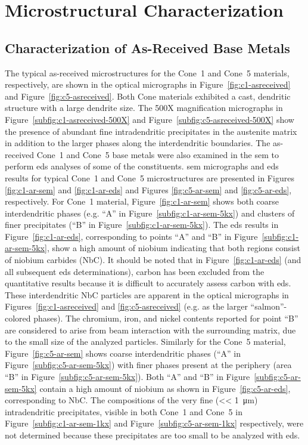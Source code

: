 {\section{Microstructural Characterization}
\subsection{Characterization of As-Received Base Metals}
The typical as-received microstructures for the Cone~1 and Cone~5 materials, respectively, are shown in the optical micrographs in Figure~\ref{fig:c1-asreceived} and Figure~\ref{fig:c5-asreceived}.  Both Cone materials exhibited a cast, dendritic structure with a large dendrite size.  The 500X magnification micrographs in Figure~\ref{subfig:c1-asreceived-500X} and Figure~\ref{subfig:c5-asreceived-500X} show the presence of abundant fine intradendritic precipitates in the austenite matrix in addition to the larger phases along the interdendritic boundaries. The as-received Cone~1 and Cone~5 base metals were also examined in the \gls{sem} to perform \gls{eds} analyses of some of the constituents. \Gls{sem} micrographs and \gls{eds} results for typical Cone~1 and Cone~5 microstructures are presented in Figures \ref{fig:c1-ar-sem} and \ref{fig:c1-ar-eds} and Figures \ref{fig:c5-ar-sem} and \ref{fig:c5-ar-eds}, respectively. For Cone~1 material, Figure~\ref{fig:c1-ar-sem} shows both coarse interdendritic phases (e.g. ``A'' in Figure~\ref{subfig:c1-ar-sem-5kx}) and clusters of finer precipitates (``B'' in Figure~\ref{subfig:c1-ar-sem-5kx}). The \gls{eds} results in Figure~\ref{fig:c1-ar-eds}, corresponding to points ``A'' and ``B'' in Figure~\ref{subfig:c1-ar-sem-5kx}, show a high amount of niobium indicating that both regions consist of niobium carbides (NbC). It should be noted that in Figure~\ref{fig:c1-ar-eds} (and all subsequent \gls{eds} determinations), carbon has been excluded from the quantitative results because it is difficult to accurately assess carbon with \gls{eds}. These interdendritic NbC particles are apparent in the optical micrographs in Figures~\ref{fig:c1-asreceived} and \ref{fig:c5-asreceived} (e.g. as the larger ``salmon''-colored phases). The chromium, iron, and nickel contents reported for point ``B'' are considered to arise from beam interaction with the surrounding matrix, due to the small size of the analyzed particles. Similarly for the Cone~5 material, Figure~\ref{fig:c5-ar-sem} shows coarse interdendritic phases (``A'' in Figure~\ref{subfig:c5-ar-sem-5kx}) with finer phases present at the periphery (area ``B'' in Figure~\ref{subfig:c5-ar-sem-5kx}). Both ``A'' and ``B'' in Figure~\ref{subfig:c5-ar-sem-5kx} contain a high amount of niobium as shown in Figure~\ref{fig:c5-ar-eds}, corresponding to NbC. The compositions of the very fine (<< \SI{1}{\micro\meter}) intradendritic precipitates, visible in both Cone~1 and Cone~5 in Figure~\ref{subfig:c1-ar-sem-1kx} and Figure~\ref{subfig:c5-ar-sem-1kx} respectively, were not determined because these precipitates are too small to be analyzed with \gls{eds}. 

}
